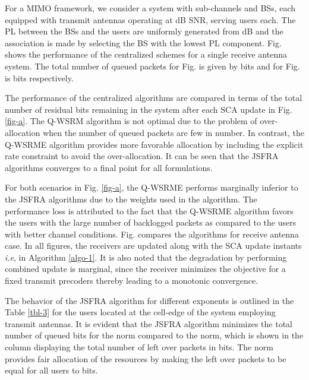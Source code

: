 For a \ac{MIMO} framework, we consider a system with  sub-channels and  \acp{BS}, each equipped with  transmit antennas operating at dB \ac{SNR}, serving  users each. The \ac{PL} between the \acp{BS} and the users are uniformly generated from \me{[0,-3]} dB and the association is made by selecting the \ac{BS} with the lowest \ac{PL} component. Fig.  shows the performance of the centralized schemes for a single receive antenna system. The total number of queued packets for Fig.  is given by  bits and for Fig.  is  bits respectively.

The performance of the centralized algorithms are compared in terms of the total number of residual bits remaining in the system after each \ac{SCA} update in Fig. \ref{fig-a}. The \ac{Q-WSRM} algorithm is not optimal due to the problem of over-allocation when the number of queued packets are few in number. In contrast, the \ac{Q-WSRME} algorithm provides more favorable allocation by including the explicit rate constraint to avoid the over-allocation. It can be seen that the \ac{JSFRA} algorithms converges to a final point for all formulations. 

For both scenarios in Fig. \ref{fig-a}, the \ac{Q-WSRME} performs marginally inferior to the \ac{JSFRA} algorithms due to the weights used in the algorithm. The performance loss is  attributed to the fact that the \ac{Q-WSRME} algorithm favors the users with the large number of backlogged packets as compared to the users with better channel conditions. Fig.  compares the algorithms for  receive antenna case. In all figures, the receivers are updated along with the \ac{SCA} update instants \textit{i.e},  in Algorithm \ref{algo-1}. It is also noted that the degradation by performing combined update is marginal, since the receiver minimizes the objective for a fixed transmit precoders thereby leading to a monotonic convergence.

The behavior of the \ac{JSFRA} algorithm for different exponents  is outlined in the Table \ref{tbl-3} for the users located at the cell-edge of the system employing  transmit antennas. It is evident that the \ac{JSFRA} algorithm minimizes the total number of queued bits for the  norm compared to the  norm, which is shown in the column displaying the total number of left over packets \me{\chi} in bits. The \me{\ell_{\infty}} norm provides fair allocation of the resources by making the left over packets to be equal for all users to  bits.
